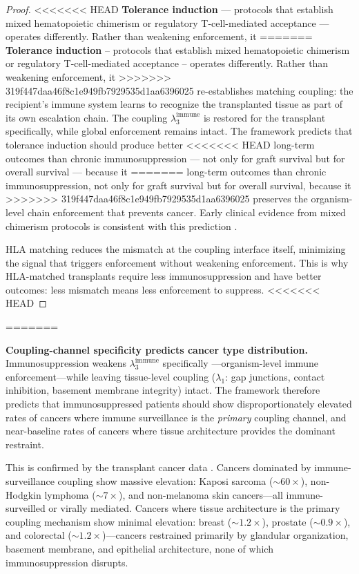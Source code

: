 \documentclass[11pt]{article}
\theoremstyle{definition}
\theoremstyle{remark}
\begin{document}
\begin{proof}
<<<<<<< HEAD
\textbf{Tolerance induction} --- protocols that establish mixed
hematopoietic chimerism or regulatory T-cell-mediated acceptance
--- operates differently. Rather than weakening enforcement, it
=======
\textbf{Tolerance induction} -- protocols that establish mixed
hematopoietic chimerism or regulatory T-cell-mediated acceptance
-- operates differently. Rather than weakening enforcement, it
>>>>>>> 319f447daa46f8c1e949fb7929535d1aa6396025
re-establishes matching coupling: the recipient's immune system
learns to recognize the transplanted tissue as part of its own
escalation chain. The coupling
$\lambda_3^{\mathrm{immune}}$ is restored for the transplant
specifically, while global enforcement remains intact. The
framework predicts that tolerance induction should produce better
<<<<<<< HEAD
long-term outcomes than chronic immunosuppression --- not only
for graft survival but for overall survival --- because it
=======
long-term outcomes than chronic immunosuppression, not only
for graft survival but for overall survival, because it
>>>>>>> 319f447daa46f8c1e949fb7929535d1aa6396025
preserves the organism-level chain enforcement that prevents
cancer. Early clinical evidence from mixed chimerism protocols
is consistent with this prediction \cite{Kawai2008}.

HLA matching reduces the mismatch at the coupling interface itself,
minimizing the signal that triggers enforcement without weakening
enforcement. This is why HLA-matched transplants require less
immunosuppression and have better outcomes: less mismatch means
less enforcement to suppress.
<<<<<<< HEAD
\end{proof}
=======

\textbf{Coupling-channel specificity predicts cancer type distribution.}
Immunosuppression weakens $\lambda_3^{\mathrm{immune}}$ specifically
---organism-level immune enforcement---while leaving tissue-level
coupling ($\lambda_1$: gap junctions, contact inhibition, basement
membrane integrity) intact. The framework therefore predicts that
immunosuppressed patients should show disproportionately elevated
rates of cancers where immune surveillance is the \emph{primary}
coupling channel, and near-baseline rates of cancers where tissue
architecture provides the dominant restraint.

This is confirmed by the transplant cancer data \cite{Engels2011}.
Cancers dominated by immune-surveillance coupling show massive
elevation: Kaposi sarcoma (${\sim}60\times$), non-Hodgkin lymphoma
(${\sim}7\times$), and non-melanoma skin cancers---all
immune-surveilled or virally mediated. Cancers where tissue
architecture is the primary coupling mechanism show minimal
elevation: breast (${\sim}1.2\times$), prostate (${\sim}0.9\times$),
and colorectal (${\sim}1.2\times$)---cancers restrained primarily
by glandular organization, basement membrane, and epithelial
architecture, none of which immunosuppression disrupts.
\end{document}
